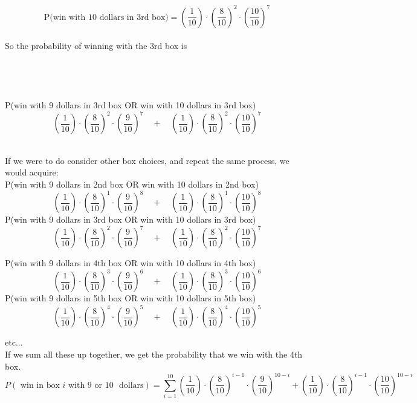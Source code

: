 \documentclass{report}
\begin{document}
\[
\textrm{P(win with 10 dollars in 3rd box)}=
\left( \frac{1}{10} \right)\cdot \left( \frac{8}{10} \right)^{2}\cdot \left(\frac{10}{10} \right)^{7}
\]
\\
So the probability of winning with the 3rd box is 
\\ \\ \\ \\ \\
P(win with 9 dollars in 3rd box OR win with 10 dollars in 3rd box)
\[
\left( \frac{1}{10} \right)\cdot \left( \frac{8}{10} \right)^{2}\cdot \left(\frac{9}{10} \right)^{7}
\quad
+
\quad
\left( \frac{1}{10} \right)\cdot \left( \frac{8}{10} \right)^{2}\cdot \left(\frac{10}{10} \right)^{7}
\]
\\ \pagebreak

If we were to do consider other box choices, and repeat the same process, we would acquire:\\
P(win with 9 dollars in 2nd box OR win with 10 dollars in 2nd box)
\[
\left( \frac{1}{10} \right)\cdot \left( \frac{8}{10} \right)^{1}\cdot \left(\frac{9}{10} \right)^{8}
\quad
+
\quad
\left( \frac{1}{10} \right)\cdot \left( \frac{8}{10} \right)^{1}\cdot \left(\frac{10}{10} \right)^{8}
\]
P(win with 9 dollars in 3rd box OR win with 10 dollars in 3rd box)
\[
\left( \frac{1}{10} \right)\cdot \left( \frac{8}{10} \right)^{2}\cdot \left(\frac{9}{10} \right)^{7}
\quad
+
\quad
\left( \frac{1}{10} \right)\cdot \left( \frac{8}{10} \right)^{2}\cdot \left(\frac{10}{10} \right)^{7}
\]

P(win with 9 dollars in 4th box OR win with 10 dollars in 4th box)
\[
\left( \frac{1}{10} \right)\cdot \left( \frac{8}{10} \right)^{3}\cdot \left(\frac{9}{10} \right)^{6}
\quad
+
\quad
\left( \frac{1}{10} \right)\cdot \left( \frac{8}{10} \right)^{3}\cdot \left(\frac{10}{10} \right)^{6}
\]
P(win with 9 dollars in 5th box OR win with 10 dollars in 5th box)
\[
\left( \frac{1}{10} \right)\cdot \left( \frac{8}{10} \right)^{4}\cdot \left(\frac{9}{10} \right)^{5}
\quad
+
\quad
\left( \frac{1}{10} \right)\cdot \left( \frac{8}{10} \right)^{4}\cdot \left(\frac{10}{10} \right)^{5}
\]

etc... \\
If we sum all these up together, we get the probability that we win with the 4th box. \\
\[
P ( \textrm{ win in box } i \textrm{ with 9 or 10 }  \textrm{ dollars}) =
\sum_{i=1}^{10}
\left( \frac{1}{10} \right)\cdot \left( \frac{8}{10} \right)^{i-1}\cdot \left(\frac{9}{10} \right)^{10-i} + \left( \frac{1}{10} \right)\cdot \left( \frac{8}{10} \right)^{i-1}\cdot \left(\frac{10}{10} \right)^{10-i} 
\]
\end{document}
